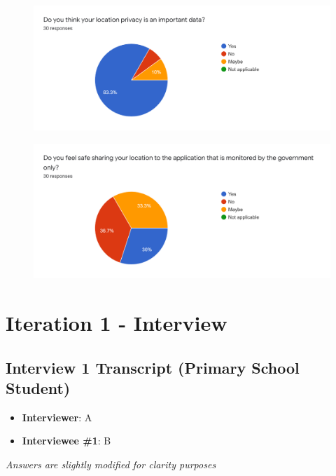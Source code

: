 \begin{appendices}
\begin{figure}[H]
    \end{figure}
    \begin{figure}[H]
      \centering
      \includegraphics[width=\linewidth]{img/Survey/Q8.png}
    \end{figure}
    \begin{figure}[H]
      \centering
      \includegraphics[width=\linewidth]{img/Survey/Q9.png}
    \end{figure}

    \section{Iteration 1 - Interview} \label{appendix:interview}

    \subsection{Interview 1 Transcript (Primary School Student)}
      \begin{itemize}
        \item \textbf{Interviewer}: A
        \item \textbf{Interviewee \#1}: B
      \end{itemize}
      \par \textit{Answers are slightly modified for clarity purposes}


\end{appendices}
